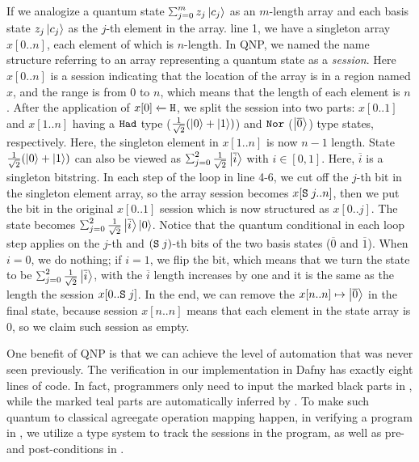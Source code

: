 If we analogize a quantum state $\sch{m}{z_j}{c_j}$ as an $m$-length array and each basis state $z_j\left\vert{c_j}\right\rangle$ as the $j$-th element in the array.  line 1, we have a singleton array $x[0..n]$, each element of which is $n$-length.
In QNP, we named the name structure referring to an array representing a quantum state as a \emph{session}. Here $x[0..n]$ is a session indicating that the location of the array is in a region named $x$, and the range is from $0$ to $n$, which means that the length of each element is $n$. After the application of ${x[0]} \xleftarrow{} {\texttt{H}}$, we split the session into two parts: $x[0..1]$ and $x[1..n]$ having a $\texttt{Had}$ type ($\frac{1}{\sqrt{2}}(\left\vert{0}\right\rangle+\left\vert{1}\right\rangle)$) and $\texttt{Nor}$ ($\left\vert{\overline{0}}\right\rangle$) type states, respectively.
Here, the singleton element in $x[1..n]$ is now $n-1$ length.
State $\frac{1}{\sqrt{2}}(\left\vert{0}\right\rangle+\left\vert{1}\right\rangle)$ can also be viewed as $\sch{2}{\frac{1}{\sqrt{2}}}{\overline{i}}$ with $i\in[0,1]$.
Here, $\overline{i}$ is a singleton bitstring. 
In each step of the loop in line 4-6, we cut off the $j$-th bit in the singleton element array, so the array session becomes $x[\texttt{S}\;j..n]$, then we put the bit in the original $x[0..1]$ session which is now structured as $x[0..j]$.
The state becomes $\sch{2}{\frac{1}{\sqrt{2}}}{\overline{i}}\ket{0}$. Notice that the quantum conditional in each loop step applies on the $j$-th and $(\texttt{S}\;j)$-th bits of the two basis states ($\overline{0}$ and $\overline{1}$). When $i=0$, we do nothing; if $i=1$, we flip the bit, which means that we turn the state to be $\sch{2}{\frac{1}{\sqrt{2}}}{\overline{i}}$, with the $\overline{i}$ length increases by one and it is the same as the length the session $x[0..\texttt{S}\;j]$. In the end, we can remove the $x[n..n]\mapsto \left\vert{\overline{0}}\right\rangle$ in the final state, because session $x[n..n]$ means that each element in the state array is $0$, so we claim such session as empty. 

One benefit of QNP is that we can achieve the level of automation that was never seen previously. The  verification in our \qafny implementation in Dafny has exactly eight lines of code. In fact, programmers only need to input the marked black parts in , while the marked teal parts are automatically inferred by \qafny.
To make such quantum to classical agreegate operation mapping happen, in verifying a program in \qafny, we utilize a type system to track the sessions in the program, as well as pre- and post-conditions in . 












